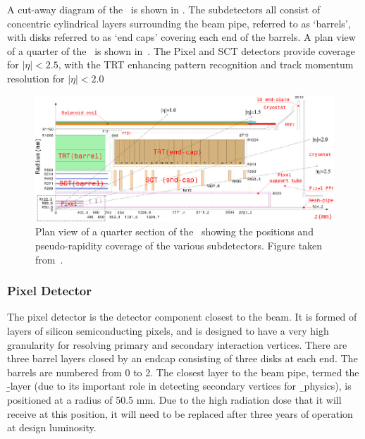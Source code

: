 A cut-away diagram of the \id\ is shown in . 
The subdetectors all consist of
concentric cylindrical layers surrounding the beam pipe, referred to as
`barrels', with disks referred to as `end caps' covering each end of the
barrels. A plan view of a quarter of the \id\ is shown
in~. The Pixel and SCT detectors provide coverage for $|\eta|<2.5$,
with the TRT enhancing pattern recognition and track momentum resolution for
$|\eta|<2.0$

\begin{figure}[h]
\centering
\includegraphics[width=\textwidth]{FigID26-mod-011107_crop}
\caption[Plan view of a quarter section of the \id\ showing the
positions and pseudo-rapidity coverage of the various subdetectors.]{Plan view
of a quarter section of the \id\ showing the
positions and pseudo-rapidity coverage of the various subdetectors. Figure taken from~\cite{Aad:1125884}.}
\label{fig:id-plan}
\end{figure}

\subsubsection{Pixel Detector}

The pixel detector is the detector component closest to the beam. It is formed
of layers of silicon semiconducting pixels, and is designed to have a very
high granularity for resolving primary and secondary interaction vertices. There
are three barrel layers closed by an endcap consisting of three disks at each
end. The barrels are numbered from 0 to 2. The closest layer to the beam
pipe, termed the \b-layer (due to its important role in detecting secondary
vertices for \b\ physics), is
positioned at a radius of 50.5 mm. Due to the high radiation dose that it will
receive at this position, it will need to be replaced after three years of operation at design luminosity.

